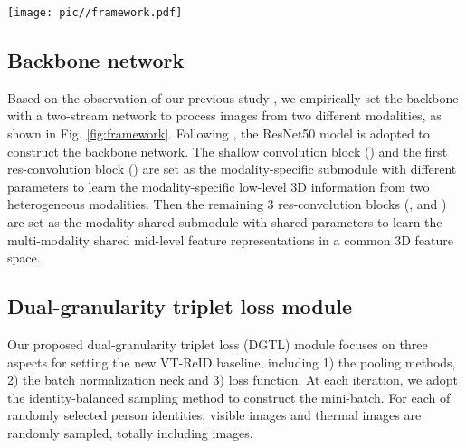 \documentclass[journal]{IEEEtran}
\begin{document}
\begin{figure*}
\centering
\texttt{[image: pic//framework.pdf]}
\caption{The proposed dual-granularity triplet loss based feature learning framework for VT-ReID, including two components: backbone network and dual-granularity triplet loss module. The backbone network contains two modality-specific submodules with independent parameters and one modality-shared submodule with shared parameters.
The dual-granularity triplet loss module focuses on learning high quality person features with inter-class discrimination and intra-class compactness ability.
At the beginning, the 3D feature maps outputted from the backbone are respectively processed by two pooling methods in the fine granularity branch and coarse granularity branch.
In fine granularity branch, the pooling features are supervised by the sample-based triplet loss () and identification loss () with BNNeck \cite{Luo2019ASB} to obtain features , following the black lines (our baseline). Meanwhile, in the coarse granularity branch, the pooling features are firstly fused with . Afterwards, the fused features are supervised by the center-based triplet loss () and identification loss () from the coarse granularity level to obtain features , following the additional red lines. During testing, the  and   with L2 normalization can be adopted as the person features.}
\label{fig:framework}
\end{figure*}

\subsection{Backbone network}
\label{ssec:backbone}
Based on the observation of our previous study \cite{Liu2020ParametersSE}, we empirically set the backbone with a two-stream network to process images from two different modalities, as shown in Fig. \ref{fig:framework}.
Following \cite{ye2020vipr,Liu2020ParametersSE,ye2020dynamic}, the ResNet50 \cite{he2016deep} model is adopted to construct the backbone network. The shallow convolution block () and the first res-convolution block () are set as the modality-specific submodule with different parameters to learn the modality-specific low-level 3D information from two heterogeneous modalities. Then the remaining 3 res-convolution blocks (,  and ) are set as the modality-shared submodule with shared parameters to learn the multi-modality shared mid-level feature representations in a common 3D feature space.

\subsection{Dual-granularity triplet loss module}
Our proposed dual-granularity triplet loss (DGTL) module focuses on three aspects for setting the new VT-ReID baseline, including 1) the pooling methods, 2) the batch normalization neck and 3) loss function.
At each iteration, we adopt the identity-balanced sampling method \cite{ye2020vipr,Liu2020ParametersSE} to construct the mini-batch. For each of  randomly selected person identities,  visible images and  thermal images are randomly sampled, totally including  images.
\end{document}
